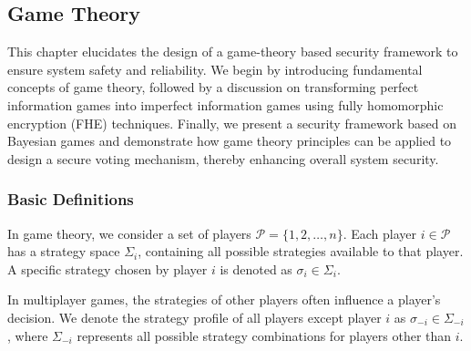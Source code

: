 \documentclass[11pt]{article}
\begin{document}
\subsection{Game Theory}
\label{sec:game_theory}
This chapter elucidates the design of a game-theory based security framework to ensure system safety and reliability. We begin by introducing fundamental concepts of game theory, followed by a discussion on transforming perfect information games into imperfect information games using fully homomorphic encryption (FHE) techniques. Finally, we present a security framework based on Bayesian games and demonstrate how game theory principles can be applied to design a secure voting mechanism, thereby enhancing overall system security.

\subsubsection{Basic Definitions}

In game theory, we consider a set of players $\mathcal{P} = \{1,2,\ldots,n\}$. Each player $i \in \mathcal{P}$ has a strategy space $\Sigma_i$, containing all possible strategies available to that player. A specific strategy chosen by player $i$ is denoted as $\sigma_i \in \Sigma_i$.

In multiplayer games, the strategies of other players often influence a player's decision. We denote the strategy profile of all players except player $i$ as $\sigma_{-i} \in \Sigma_{-i}$, where $\Sigma_{-i}$ represents all possible strategy combinations for players other than $i$.
\end{document}
